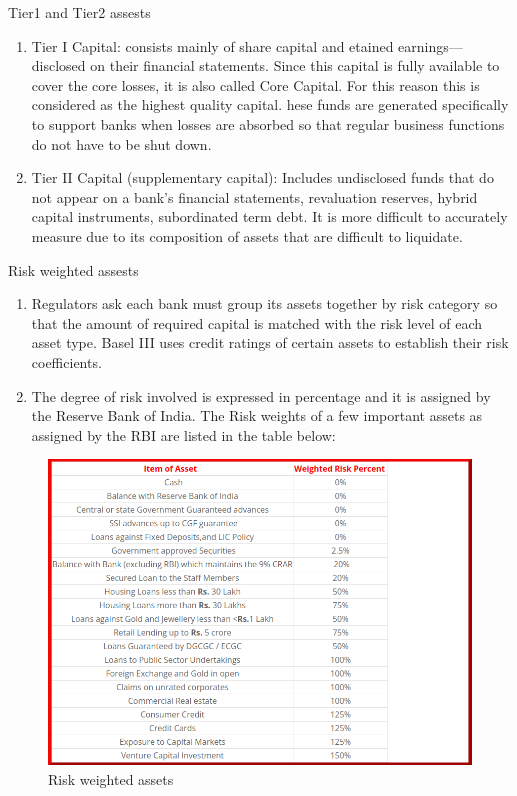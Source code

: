 \documentclass{beamer}
\begin{document}
\begin{frame}{Tier1 and Tier2 assests}
	\begin{enumerate}
		\item Tier I Capital: consists mainly of share capital and etained earnings—disclosed on their financial statements. Since this capital is fully available to cover the core losses, it is also called Core Capital. For this reason this is considered as the highest quality capital. hese funds are generated specifically to support banks when losses are absorbed so that regular business functions do not have to be shut down.
		\item Tier II Capital (supplementary capital): Includes undisclosed funds that do not appear on a bank's financial statements, revaluation reserves, hybrid capital instruments, subordinated term debt. It is more difficult to accurately measure due to its composition of assets that are difficult to liquidate.
	\end{enumerate}
\end{frame}

\begin{frame}{Risk weighted assests}
	\begin{enumerate}
		\item Regulators ask each bank must group its assets together by risk category so that the amount of required capital is matched with the risk level of each asset type. Basel III uses credit ratings of certain assets to establish their risk coefficients. 
		\item The degree of risk involved is expressed in percentage and it is assigned by the Reserve Bank of India. The Risk weights of a few important assets as assigned by the RBI are listed in the table below:
	\end{enumerate}
\end{frame}

\begin{frame}
	\begin{figure}
		\centering
		\includegraphics[width=0.7\linewidth]{Risk_weighted_assets.png}
		\caption{Risk weighted assets}
		\label{fig:riskweightedassets}
	\end{figure}
\end{frame}
\end{document}

